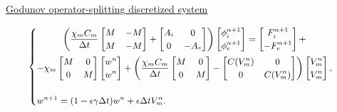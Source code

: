 \documentclass[9pt]{beamer}
\begin{document}
\begin{frame}
\begin{columns}
\begin{column}{0.5\textwidth}
            \end{column}
     \end{columns}
     \vspace{4mm}
\begin{center}
\underline{Godunov operator-splitting discretized system}
\end{center}
\begin{equation*}
\small
\begin{cases}
\begin{gathered}
\left(
\frac{\chi_m C_m}{\Delta t} \begin{bmatrix}M & -M \\ M & -M\end{bmatrix}
+ \begin{bmatrix} A_i & 0 \\ 0 & -A_e \end{bmatrix}
\right) \begin{bmatrix} \phi_i^{n+1} \\ \phi_e^{n+1}  \end{bmatrix} =
\begin{bmatrix} F_i^{n+1} \\ -F_e^{n+1} \end{bmatrix} + \\ -
\chi_m\begin{bmatrix} M & 0 \\ 0 & M \end{bmatrix} \begin{bmatrix} w^n \\ w^n \end{bmatrix} +
\left(\frac{\chi_mC_m}{\Delta t}\begin{bmatrix} M & 0 \\ 0 & M \end{bmatrix}
- \begin{bmatrix} C(V_m^n) & 0 \\ 0 & C(V_m^n)\end{bmatrix} 
\right) \begin{bmatrix} V_m^n \\ V_m^n \end {bmatrix},
\end{gathered} \\ \\
w^{n+1} = (1-\epsilon \gamma \Delta t) w^n + \epsilon \Delta tV_m^n.
\end{cases}
\end{equation*}

\end{frame}
\end{document}
